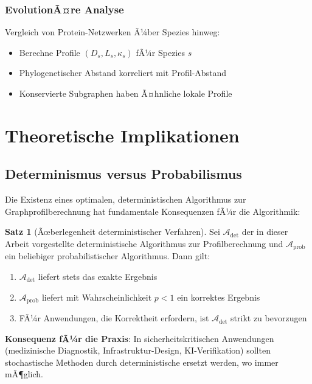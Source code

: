 ﻿\documentclass[a4paper,12pt]{article}
\theoremstyle{definition}
\newtheorem{satz}{Satz}
\begin{document}
	\subsubsection{EvolutionÃ¤re Analyse}
	
	Vergleich von Protein-Netzwerken Ã¼ber Spezies hinweg:
	
	\begin{itemize}
		\item[-] Berechne Profile $(D_s, L_s, \kappa_s)$ fÃ¼r Spezies $s$
		\item[-] Phylogenetischer Abstand korreliert mit Profil-Abstand
		\item[-] Konservierte Subgraphen haben Ã¤hnliche lokale Profile
	\end{itemize}
	
	\section{Theoretische Implikationen}
	
	\subsection{Determinismus versus Probabilismus}
	
	Die Existenz eines optimalen, deterministischen Algorithmus zur Graphprofilberechnung hat fundamentale Konsequenzen fÃ¼r die Algorithmik:
	
	\begin{satz}[Ãœberlegenheit deterministischer Verfahren]
		Sei $\mathcal{A}_{\text{det}}$ der in dieser Arbeit vorgestellte deterministische Algorithmus zur Profilberechnung und $\mathcal{A}_{\text{prob}}$ ein beliebiger probabilistischer Algorithmus. Dann gilt:
		\begin{enumerate}
			\item $\mathcal{A}_{\text{det}}$ liefert stets das exakte Ergebnis
			\item $\mathcal{A}_{\text{prob}}$ liefert mit Wahrscheinlichkeit $p < 1$ ein korrektes Ergebnis
			\item FÃ¼r Anwendungen, die Korrektheit erfordern, ist $\mathcal{A}_{\text{det}}$ strikt zu bevorzugen
		\end{enumerate}
	\end{satz}
	
	\textbf{Konsequenz fÃ¼r die Praxis}: In sicherheitskritischen Anwendungen (medizinische Diagnostik, Infrastruktur-Design, KI-Verifikation) sollten stochastische Methoden durch deterministische ersetzt werden, wo immer mÃ¶glich.
	
\end{document}
